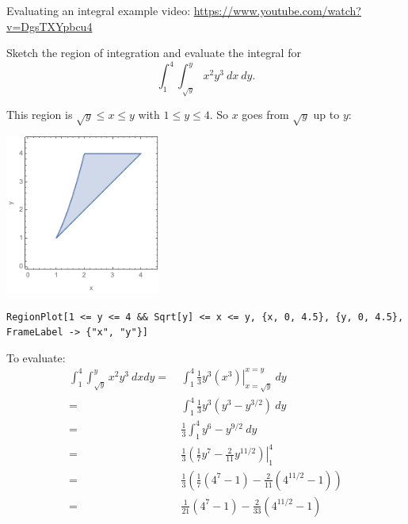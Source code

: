 \documentclass[12pt,letterpaper,noanswers]{exam}
\begin{document}
\begin{questions}
\begin{parts}



\end{parts}

\item Evaluating an integral example video: \url{https://www.youtube.com/watch?v=DgsTXYpbcu4}
\begin{parts}
\item Sketch the region of integration and evaluate the integral for \[\int_1^4\int_{\sqrt{y}}^y x^2y^3\ dx\ dy.\]

\begin{solution}
This region is $\sqrt{y}\leq x\leq y$ with $1\leq y\leq 4$.  So $x$ goes from $\sqrt{y}$ up to $y$:

\includegraphics[width=2in]{img/HW06_r3.png}

\texttt{RegionPlot[1 <= y <= 4 \&\& Sqrt[y] <= x <= y, \{x, 0, 4.5\}, \{y, 0, 4.5\}, 
 FrameLabel -> \{"x", "y"\}]}
 
 To evaluate:
 \begin{align*}
 \int_1^4\int_{\sqrt{y}}^y x^2y^3\ dx dy = &\ \int_1^4\frac{1}{3}y^3\left.(x^3)\right\vert_{x=\sqrt{y}}^{x=y}\ dy\\
 =&\ \int_1^4\frac{1}{3}y^3(y^3-y^{3/2})\ dy \\
  =&\ \frac{1}{3}\int_1^4y^6-y^{9/2}\ dy \\
    =&\ \frac{1}{3}\left.(\frac{1}{7}y^7-\frac{2}{11}y^{11/2})\right\vert_1^4 \\
    =&\ \frac{1}{3}(\frac{1}{7}(4^7-1)-\frac{2}{11}(4^{11/2}-1)) \\
        =&\ \frac{1}{21}(4^7-1)-\frac{2}{33}(4^{11/2}-1) \\
 \end{align*}
\end{solution}


\end{parts}
\end{questions}
\end{document}
